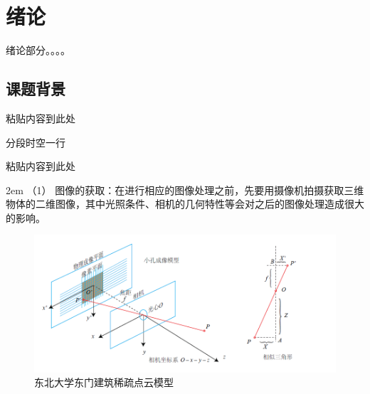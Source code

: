 \chapter{绪论}
绪论部分。。。。
\section{课题背景}
粘贴内容到此处

分段时空一行

粘贴内容到此处

\noindent
{}
\hangindent 2em
（1） 图像的获取：在进行相应的图像处理之前，先要用摄像机拍摄获取三维物体的二维图像，其中光照条件、相机的几何特性等会对之后的图像处理造成很大的影响。

\begin{figure}[!htbp]
	\centering
	\includegraphics[width=1.00\textwidth]{myfigures/slam-01.png} %
	\caption{东北大学东门建筑稀疏点云模型} %
	\label{neuxishu} %
\end{figure}

